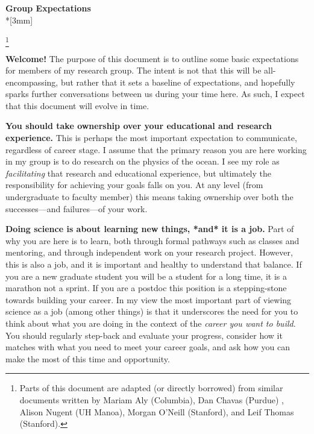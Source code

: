 \documentclass{classassignments}
\newcommand\blfootnote[1]{%
	\begingroup
	\renewcommand\thefootnote{}\footnote{#1}%
	\addtocounter{footnote}{-1}%
	\endgroup
}
\begin{document}

\begin{center}
	{\Large{\bf Group Expectations}}\\*[3mm]
\end{center}
\blfootnote{Parts of this document are adapted (or directly borrowed) from similar documents written by Mariam Aly (Columbia), Dan Chavas (Purdue) , Alison Nugent (UH Manoa), Morgan O'Neill (Stanford), and Leif Thomas (Stanford).}
\textbf{Welcome!} The purpose of this document is to outline some basic expectations for members of my research group. The intent is not that this will be all-encompassing, but rather that it sets a baseline of expectations, and hopefully sparks further conversations between us during your time here. As such, I expect that this document will evolve in time.\bigskip

\textbf{You should take ownership over your educational and research experience.} This is perhaps the most important expectation to communicate, regardless of career stage. I assume that the primary reason you are here working in my group is to do research on the physics of the ocean. I see my role as \textit{facilitating} that research and educational experience, but ultimately the responsibility for achieving your goals falls on you. At any level (from undergraduate to faculty member) this means taking ownership over both the successes---and failures---of your work.\bigskip

\textbf{Doing science is about learning new things, *and* it is a job.} Part of why you are here is to learn, both through formal pathways such as classes and mentoring, and through independent work on your research project. However, this is also a job, and it is important and healthy to understand that balance. If you are a new graduate student you will be a student for a long time, it is a marathon not a sprint. If you are a postdoc this position is a stepping-stone towards building your career. In my view the most important part of viewing science as a job (among other things) is that it underscores the need for you to think about what you are doing in the context of the \textit{career you want to build}. You should regularly step-back and evaluate your progress, consider how it matches with what you need to meet your career goals, and ask how you can make the most of this time and opportunity. 
\end{document}
